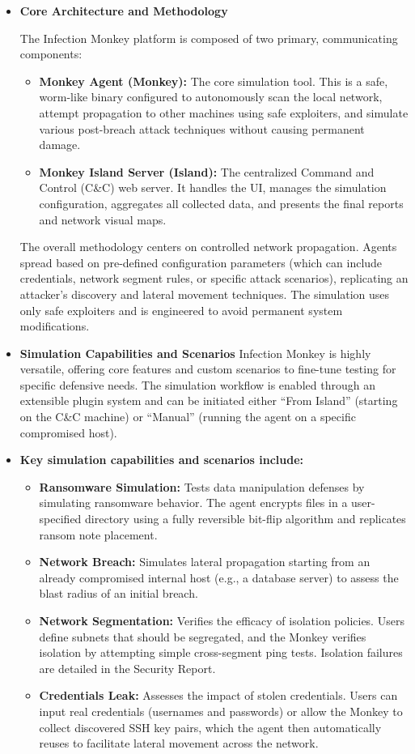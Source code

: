 \begin{itemize}
    \item \textbf{Core Architecture and Methodology}

The Infection Monkey platform is composed of two primary, communicating components:

\begin{itemize}
    \item \textbf{Monkey Agent (Monkey):} The core simulation tool. This is a safe, worm-like binary configured to autonomously scan the local network, attempt propagation to other machines using safe exploiters, and simulate various post-breach attack techniques without causing permanent damage.

    \item \textbf{Monkey Island Server (Island):} The centralized Command and Control (C\&C) web server. It handles the UI, manages the simulation configuration, aggregates all collected data, and presents the final reports and network visual maps.
\end{itemize}

The overall methodology centers on controlled network propagation. Agents spread based on pre-defined configuration parameters (which can include credentials, network segment rules, or specific attack scenarios), replicating an attacker's discovery and lateral movement techniques. The simulation uses only safe exploiters and is engineered to avoid permanent system modifications.
    \item \textbf{Simulation Capabilities and Scenarios}
Infection Monkey is highly versatile, offering core features and custom scenarios to fine-tune testing for specific defensive needs. The simulation workflow is enabled through an extensible plugin system and can be initiated either ``From Island'' (starting on the C\&C machine) or ``Manual'' (running the agent on a specific compromised host).
    \item \textbf{Key simulation capabilities and scenarios include:}
 \begin{itemize}
     \item \textbf{Ransomware Simulation:} Tests data manipulation defenses by simulating ransomware behavior. The agent encrypts files in a user-specified directory using a fully reversible bit-flip algorithm and replicates ransom note placement.
    \item \textbf{Network Breach:} Simulates lateral propagation starting from an already compromised internal host (e.g., a database server) to assess the blast radius of an initial breach.
    \item \textbf{Network Segmentation:}  Verifies the efficacy of isolation policies. Users define subnets that should be segregated, and the Monkey verifies isolation by attempting simple cross-segment ping tests. Isolation failures are detailed in the Security Report.
    \item \textbf{Credentials Leak:} Assesses the impact of stolen credentials. Users can input real credentials (usernames and passwords) or allow the Monkey to collect discovered SSH key pairs, which the agent then automatically reuses to facilitate lateral movement across the network.
 \end{itemize}


\end{itemize}
